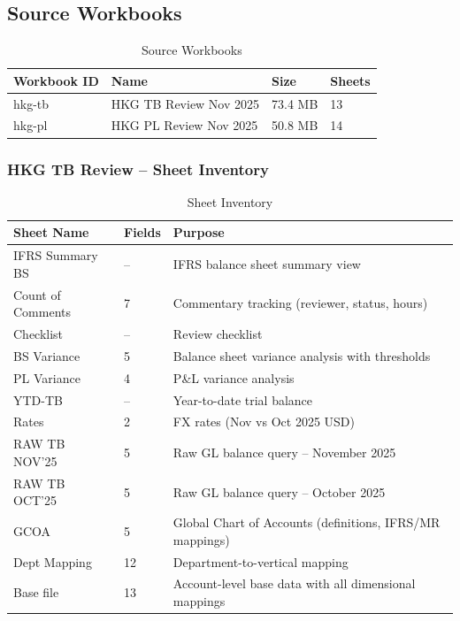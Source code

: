 \documentclass[11pt,a4paper]{article}
\begin{document}
\subsection{Source Workbooks}

\begin{table}[h]
\centering
\caption{Source Workbooks}
\begin{tabular}{@{}L{3cm}L{5.5cm}C{2.5cm}C{2cm}@{}}
\toprule
\textbf{Workbook ID} & \textbf{Name} & \textbf{Size} & \textbf{Sheets} \\
\midrule
hkg-tb & HKG TB Review Nov 2025 & 73.4 MB & 13 \\
hkg-pl & HKG PL Review Nov 2025 & 50.8 MB & 14 \\
\bottomrule
\end{tabular}
\end{table}

\subsubsection{HKG TB Review -- Sheet Inventory}

\begin{table}[h]
\centering
\caption{Sheet Inventory}
\begin{tabular}{@{}L{3.5cm}C{1.5cm}L{9cm}@{}}
\toprule
\textbf{Sheet Name} & \textbf{Fields} & \textbf{Purpose} \\
\midrule
IFRS Summary BS & -- & IFRS balance sheet summary view \\
Count of Comments & 7 & Commentary tracking (reviewer, status, hours) \\
Checklist & -- & Review checklist \\
BS Variance & 5 & Balance sheet variance analysis with thresholds \\
PL Variance & 4 & P\&L variance analysis \\
YTD-TB & -- & Year-to-date trial balance \\
Rates & 2 & FX rates (Nov vs Oct 2025 USD) \\
RAW TB NOV'25 & 5 & Raw GL balance query -- November 2025 \\
RAW TB OCT'25 & 5 & Raw GL balance query -- October 2025 \\
GCOA & 5 & Global Chart of Accounts (definitions, IFRS/MR mappings) \\
Dept Mapping & 12 & Department-to-vertical mapping \\
Base file & 13 & Account-level base data with all dimensional mappings \\
\bottomrule
\end{tabular}
\end{table}
\end{document}
